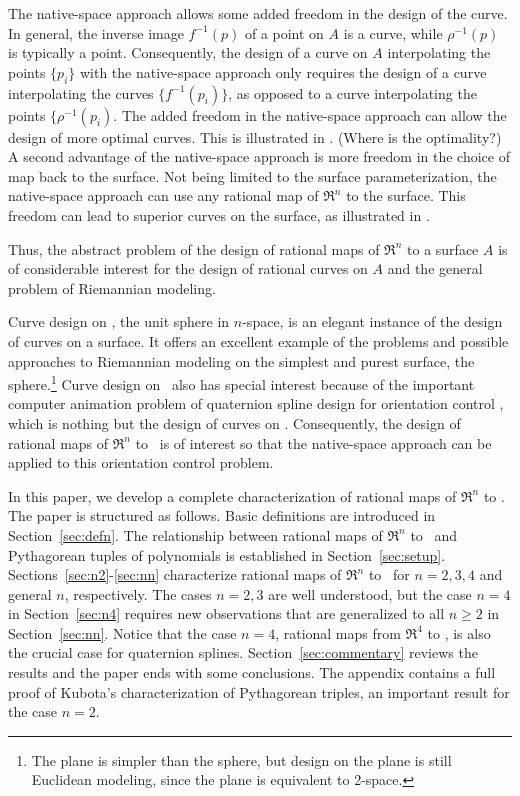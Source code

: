 The native-space approach allows some added freedom in the design of the curve.
In general, the inverse image $f^{-1}(p)$ of a point on $A$ is a curve,
while $\rho^{-1}(p)$ is typically a point.
Consequently, the design of a curve on $A$ interpolating the points $\{p_i\}$
with the native-space approach
only requires the design of a curve interpolating the curves
$\{f^{-1}(p_i)\}$, as opposed to a curve interpolating
the points $\{\rho^{-1}(p_i)$.
The added freedom in the native-space approach can allow the design
of more optimal curves.
This is illustrated in \cite{dietz93}. (Where is the optimality?)
A second advantage of the native-space approach is more freedom
in the choice of map back to the surface.
Not being limited to the surface parameterization,
the native-space approach can use any rational map of $\Re^n$ to the surface.
This freedom can lead to superior curves on the surface, as illustrated
in \cite{jj+jimbo98}.

Thus, the abstract problem of the design of rational maps 
of $\Re^{n}$ to a surface $A$ is of considerable interest for the 
design of rational curves on $A$ and the general problem of
Riemannian modeling.

Curve design on , the unit sphere in $n$-space,
is an elegant instance of the design of curves on a surface.
It offers an excellent example of the problems and possible approaches
to Riemannian modeling on the simplest and purest surface, 
the sphere.\footnote{The plane is simpler than the sphere,
	but design on the plane is still Euclidean modeling, since
	the plane is equivalent to 2-space.}
Curve design on \ also has special interest because
of the important computer animation problem of 
quaternion spline design for orientation control \cite{barr92,jj95,kim95},
which is nothing but the design of curves on .
Consequently, the design of rational maps of $\Re^n$ to \ 
is of interest so that the native-space approach can be applied to this
orientation control problem.

In this paper, we develop a complete characterization of rational
maps of $\Re^{n}$ to \Sn{n-1}.
The paper is structured as follows.
Basic definitions are introduced in Section~\ref{sec:defn}.
The relationship between rational maps of $\Re^{n}$ to \
and Pythagorean tuples of polynomials is established in Section~\ref{sec:setup}.
Sections~\ref{sec:n2}-\ref{sec:nn} characterize rational maps 
of $\Re^{n}$ to \Sn{n-1}\ for $n=2,3,4$ and general $n$, respectively.
The cases $n=2,3$ are well understood, but the case $n=4$ 
in Section~\ref{sec:n4} requires new observations 
that are generalized to all $n \geq 2$ in Section~\ref{sec:nn}.
Notice that the case $n=4$, rational maps from $\Re^4$ to ,
is also the crucial case for quaternion splines.
Section~\ref{sec:commentary} reviews the results
and the paper ends with some conclusions.
The appendix contains a full proof of Kubota's characterization of Pythagorean
triples, an important result for the case $n=2$.

